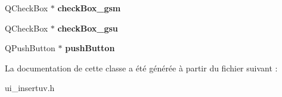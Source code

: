 \begin{DoxyCompactItemize}
\item 
\hypertarget{class_ui___insert_uv_af573c550acfcdd07ebfb98c3f280e09a}{Q\+Check\+Box $\ast$ {\bfseries check\+Box\+\_\+gsm}}\label{class_ui___insert_uv_af573c550acfcdd07ebfb98c3f280e09a}

\item 
\hypertarget{class_ui___insert_uv_a67a07fa2127ff154fc37953208321263}{Q\+Check\+Box $\ast$ {\bfseries check\+Box\+\_\+gsu}}\label{class_ui___insert_uv_a67a07fa2127ff154fc37953208321263}

\item 
\hypertarget{class_ui___insert_uv_a88e13c0de184511f4eb7a2c178d33339}{Q\+Push\+Button $\ast$ {\bfseries push\+Button}}\label{class_ui___insert_uv_a88e13c0de184511f4eb7a2c178d33339}

\end{DoxyCompactItemize}


La documentation de cette classe a été générée à partir du fichier suivant \+:\begin{DoxyCompactItemize}
\item 
ui\+\_\+insertuv.\+h\end{DoxyCompactItemize}
